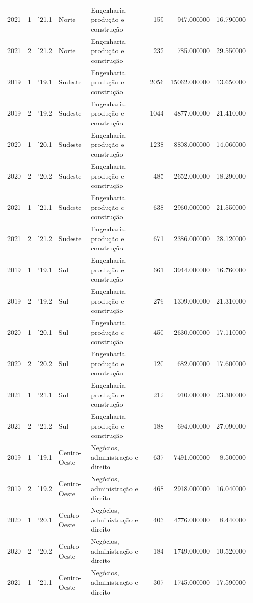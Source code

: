 \begin{longtable}{rrlllrrr}
2021 & 1 & '21.1 & Norte & Engenharia, produção e construção & 159 & 947.000000 & 16.790000 \\
2021 & 2 & '21.2 & Norte & Engenharia, produção e construção & 232 & 785.000000 & 29.550000 \\
2019 & 1 & '19.1 & Sudeste & Engenharia, produção e construção & 2056 & 15062.000000 & 13.650000 \\
2019 & 2 & '19.2 & Sudeste & Engenharia, produção e construção & 1044 & 4877.000000 & 21.410000 \\
2020 & 1 & '20.1 & Sudeste & Engenharia, produção e construção & 1238 & 8808.000000 & 14.060000 \\
2020 & 2 & '20.2 & Sudeste & Engenharia, produção e construção & 485 & 2652.000000 & 18.290000 \\
2021 & 1 & '21.1 & Sudeste & Engenharia, produção e construção & 638 & 2960.000000 & 21.550000 \\
2021 & 2 & '21.2 & Sudeste & Engenharia, produção e construção & 671 & 2386.000000 & 28.120000 \\
2019 & 1 & '19.1 & Sul & Engenharia, produção e construção & 661 & 3944.000000 & 16.760000 \\
2019 & 2 & '19.2 & Sul & Engenharia, produção e construção & 279 & 1309.000000 & 21.310000 \\
2020 & 1 & '20.1 & Sul & Engenharia, produção e construção & 450 & 2630.000000 & 17.110000 \\
2020 & 2 & '20.2 & Sul & Engenharia, produção e construção & 120 & 682.000000 & 17.600000 \\
2021 & 1 & '21.1 & Sul & Engenharia, produção e construção & 212 & 910.000000 & 23.300000 \\
2021 & 2 & '21.2 & Sul & Engenharia, produção e construção & 188 & 694.000000 & 27.090000 \\
2019 & 1 & '19.1 & Centro-Oeste & Negócios, administração e direito & 637 & 7491.000000 & 8.500000 \\
2019 & 2 & '19.2 & Centro-Oeste & Negócios, administração e direito & 468 & 2918.000000 & 16.040000 \\
2020 & 1 & '20.1 & Centro-Oeste & Negócios, administração e direito & 403 & 4776.000000 & 8.440000 \\
2020 & 2 & '20.2 & Centro-Oeste & Negócios, administração e direito & 184 & 1749.000000 & 10.520000 \\
2021 & 1 & '21.1 & Centro-Oeste & Negócios, administração e direito & 307 & 1745.000000 & 17.590000 \\

\end{longtable}
